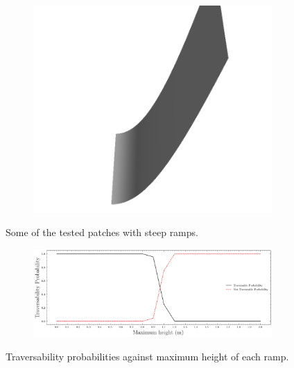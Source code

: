 \documentclass[../document.tex]{subfiles}
\begin{document}
\begin{figure}[htbp]
\begin{subfigure}[b]{0.24\textwidth}
    \includegraphics[width=\linewidth]{../img/5/custom_patches/ramp/all/19-3d.png}
    \end{subfigure}
    \caption{Some of the tested patches with steep ramps.}
    \label{fig: ramps}
    \end{figure}
\begin{figure}[htbp]
    \centering
    \begin{subfigure}[b]{1\textwidth}
    \includegraphics[width=\linewidth]{../img/5/custom_patches/ramp/predictions.png}
    \end{subfigure}
    \caption{Traversability probabilities against maximum height of each ramp.}
    \label{fig: ramps-preds}
\end{figure}
\end{document}
